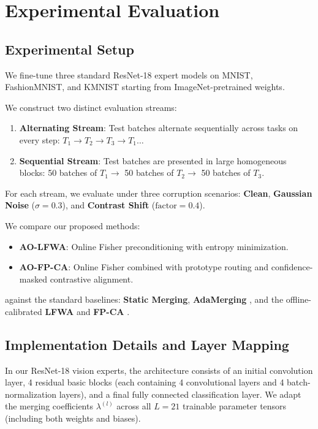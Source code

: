 \documentclass{article}
\theoremstyle{plain}
\theoremstyle{definition}
\begin{document}
\section{Experimental Evaluation}
\label{submission-experiments}

\subsection{Experimental Setup}
We fine-tune three standard ResNet-18 expert models on MNIST, FashionMNIST, and KMNIST starting from ImageNet-pretrained weights.

We construct two distinct evaluation streams:
\begin{enumerate}
    \item \textbf{Alternating Stream}: Test batches alternate sequentially across tasks on every step: $T_1 \to T_2 \to T_3 \to T_1 \dots$
    \item \textbf{Sequential Stream}: Test batches are presented in large homogeneous blocks: 50 batches of $T_1 \to$ 50 batches of $T_2 \to$ 50 batches of $T_3$.
\end{enumerate}
For each stream, we evaluate under three corruption scenarios: \textbf{Clean}, \textbf{Gaussian Noise} ($\sigma=0.3$), and \textbf{Contrast Shift} ($\text{factor}=0.4$).

We compare our proposed methods:
\begin{itemize}
    \item \textbf{AO-LFWA}: Online Fisher preconditioning with entropy minimization.
    \item \textbf{AO-FP-CA}: Online Fisher combined with prototype routing and confidence-masked contrastive alignment.
\end{itemize}
against the standard baselines: \textbf{Static Merging}, \textbf{AdaMerging} \cite{adamerging}, and the offline-calibrated \textbf{LFWA} and \textbf{FP-CA} \cite{fpca}.

\subsection{Implementation Details and Layer Mapping}
In our ResNet-18 vision experts, the architecture consists of an initial convolution layer, 4 residual basic blocks (each containing 4 convolutional layers and 4 batch-normalization layers), and a final fully connected classification layer. We adapt the merging coefficients $\lambda^{(l)}$ across all $L = 21$ trainable parameter tensors (including both weights and biases). 
\end{document}

